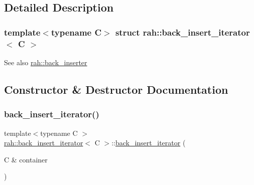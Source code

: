 \subsection{Detailed Description}
\subsubsection*{template$<$typename C$>$\newline
struct rah\+::back\+\_\+insert\+\_\+iterator$<$ C $>$}

\begin{DoxySeeAlso}{See also}
\mbox{\hyperlink{namespacerah_a0698f952bc3c4f1961929bbddb5812fe}{rah\+::back\+\_\+inserter}} 
\end{DoxySeeAlso}


\subsection{Constructor \& Destructor Documentation}
\mbox{\label{structrah_1_1back__insert__iterator_a7c208b6bee5af4ca1f87a0a52df8069c}} 
\subsubsection{\texorpdfstring{back\_insert\_iterator()}{back\_insert\_iterator()}\hspace{0.1cm}{\footnotesize\ttfamily [1/2]}}
{\footnotesize\ttfamily template$<$typename C $>$ \\
\mbox{\hyperlink{structrah_1_1back__insert__iterator}{rah\+::back\+\_\+insert\+\_\+iterator}}$<$ C $>$\+::\mbox{\hyperlink{structrah_1_1back__insert__iterator}{back\+\_\+insert\+\_\+iterator}} (\begin{DoxyParamCaption}\item[{C \&}]{container }\end{DoxyParamCaption})\hspace{0.3cm}{\ttfamily [inline]}}

\mbox{\label{structrah_1_1back__insert__iterator_a7c208b6bee5af4ca1f87a0a52df8069c}} 
